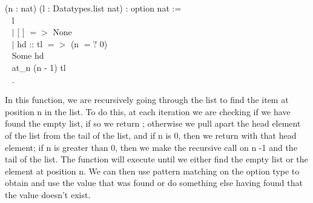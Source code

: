 \begin{code}
	\Fixpoint {} (n : nat) (l : Datatypes.list nat) : option nat :=	\\ \-\ \quad
	  \match l \with 										\\ \-\ \qquad
	  $\mid$ [ ] $=>$ None								\\ \-\ \qquad
	  $\mid$ hd :: tl $=>$  \If (n $=?$ 0)			\\ \-\ \qquad\qquad\qquad\quad
		    \Then Some hd					\\ \-\ \qquad\qquad\qquad\quad
		    \Else at\_n (n - 1) tl							\\ \-\ \qquad
	  \End.
\end{code}

\noindent
In this function, we are recursively going through the list to find the item at position n in the list.
To do this, at each iteration we are checking if we have found the empty list, if so we return ; 
otherwise we pull apart the head element of the list from the tail of the list, and if n is 0, then we return  with that head element; 
if n is greater than 0, then we make the recursive call on n -1 and the tail of the list. 
The function will execute until we either find the empty list or the element at position n.
We can then use pattern matching on the option type to obtain and use the value that was found or do something else having found that the value doesn't exist.








